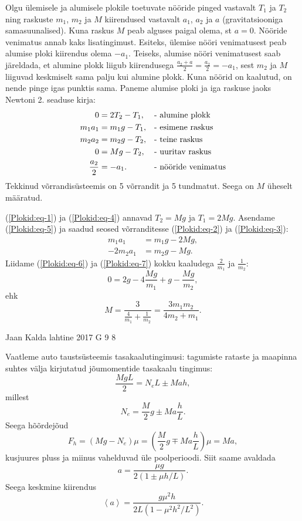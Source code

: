 \documentclass[11pt, twoside]{article}
\begin{document}
{{\ifSolution
Olgu ülemisele ja alumisele plokile toetuvate nööride pinged vastavalt $T_1$ ja $T_2$ ning raskuste $m_1$, $m_2$ ja $M$ kiirendused vastavalt $a_1$, $a_2$ ja $a$ (gravitatsiooniga samasuunalised). Kuna raskus $M$ peab alguses paigal olema, st $a = 0$. Nööride venimatus annab kaks lisatingimust. Esiteks, ülemise nööri venimatusest peab alumise ploki kiirendus olema $-a_1$. Teiseks, alumise nööri venimatusest saab järeldada, et alumine plokk liigub kiirendusega $\frac{a_2 + a}{2} = \frac{a_2}{2} = -a_1$, sest $m_2$ ja $M$ liiguvad keskmiselt sama palju kui alumine plokk. Kuna nöörid on kaalutud, on nende pinge igas punktis sama. Paneme alumise ploki ja iga raskuse jaoks Newtoni 2. seaduse kirja:
\begin{align}
0 &= 2T_2 - T_1,				& &\text{- alumine plokk}\label{Plokid:eq-1}\\
m_1a_1 &= m_1g - T_1,			& &\text{- esimene raskus}\label{Plokid:eq-2}\\
m_2a_2 &= m_2g - T_2,			& &\text{- teine raskus}\label{Plokid:eq-3}\\
0 &= Mg - T_2,					& &\text{- uuritav raskus}\label{Plokid:eq-4}\\
\frac{a_2}{2} &= -a_1.			& &\text{- nööride venimatus\label{Plokid:eq-5}}
\end{align}
Tekkinud võrrandisüsteemis on 5 võrrandit ja 5 tundmatut. Seega on $M$ üheselt määratud.

(\ref{Plokid:eq-1}) ja (\ref{Plokid:eq-4}) annavad $T_2 = Mg$ ja $T_1 = 2Mg$. Asendame (\ref{Plokid:eq-5}) ja saadud seosed võrranditesse (\ref{Plokid:eq-2}) ja (\ref{Plokid:eq-3}):
\begin{align}
m_1a_1 &= m_1g - 2Mg, \label{Plokid:eq-6}\\
-2m_2a_1 &= m_2g - Mg. \label{Plokid:eq-7}
\end{align}
Liidame (\ref{Plokid:eq-6}) ja (\ref{Plokid:eq-7}) kokku kaaludega $\frac{2}{m_1}$ ja $\frac{1}{m_2}$:
\[
0 = 2g - 4\frac{Mg}{m_1} + g - \frac{Mg}{m_2},
\]
ehk
\[
M = \frac{3}{\frac{4}{m_1} + \frac{1}{m_2}} = \frac{3m_1m_2}{4m_2 + m_1}.
\]
\fi
}

{Jaan Kalda} %
{lahtine} %
{2017} %
{G 9} %
{8} %
{

\ifSolution
Vaatleme auto taustsüsteemis tasakaalutingimusi: tagumiste rataste ja maapinna suhtes välja kirjutatud jõumomentide tasakaalu tingimus:
\[
\frac {MgL}2=N_eL\pm Mah,
\]
millest
\[
N_e=\frac M2g\pm Ma\frac hL.
\]
Seega hõõrdejõud
\[
F_h=(Mg-N_e)\mu=\left(\frac M2g\mp Ma\frac hL\right)\mu=Ma,
\]
kusjuures pluss ja miinus vahelduvad üle poolperioodi. Siit saame avaldada
\[
a=\frac{\mu g}{2(1\pm \mu h/L)}.
\]
Seega keskmine kiirendus
\[
\left< a\right>=\frac{g\mu^2h}{2L(1-\mu^2h^2/L^2)}.
\]
\fi
}

}
\end{document}
